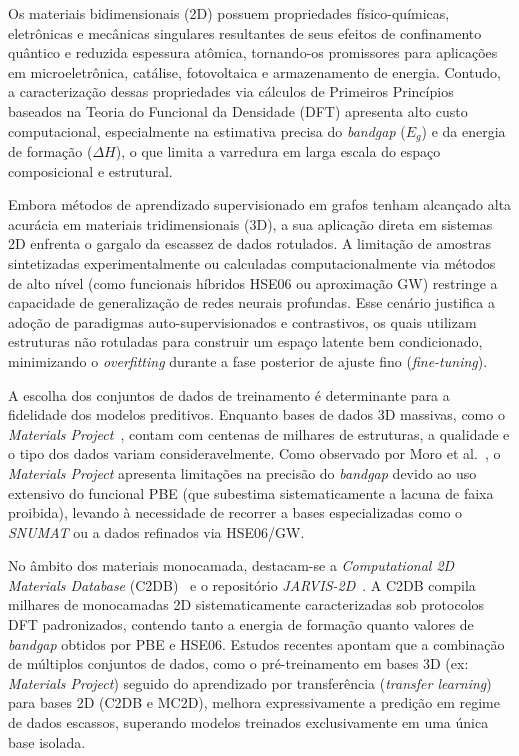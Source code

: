 Os materiais bidimensionais (2D) possuem propriedades físico-químicas, eletrônicas e mecânicas singulares resultantes de seus efeitos de confinamento quântico e reduzida espessura atômica, tornando-os promissores para aplicações em microeletrônica, catálise, fotovoltaica e armazenamento de energia. Contudo, a caracterização dessas propriedades via cálculos de Primeiros Princípios baseados na Teoria do Funcional da Densidade (DFT) apresenta alto custo computacional, especialmente na estimativa precisa do \textit{bandgap} ($E_g$) e da energia de formação ($\Delta H$), o que limita a varredura em larga escala do espaço composicional e estrutural.

Embora métodos de aprendizado supervisionado em grafos tenham alcançado alta acurácia em materiais tridimensionais (3D), a sua aplicação direta em sistemas 2D enfrenta o gargalo da escassez de dados rotulados. A limitação de amostras sintetizadas experimentalmente ou calculadas computacionalmente via métodos de alto nível (como funcionais híbridos HSE06 ou aproximação GW) restringe a capacidade de generalização de redes neurais profundas. Esse cenário justifica a adoção de paradigmas auto-supervisionados e contrastivos, os quais utilizam estruturas não rotuladas para construir um espaço latente bem condicionado, minimizando o \textit{overfitting} durante a fase posterior de ajuste fino (\textit{fine-tuning}).

A escolha dos conjuntos de dados de treinamento é determinante para a fidelidade dos modelos preditivos. Enquanto bases de dados 3D massivas, como o \textit{Materials Project}~\cite{jain2013commentary}, contam com centenas de milhares de estruturas, a qualidade e o tipo dos dados variam consideravelmente. Como observado por Moro et al.~\cite{moro2025multimodal}, o \textit{Materials Project} apresenta limitações na precisão do \textit{bandgap} devido ao uso extensivo do funcional PBE (que subestima sistematicamente a lacuna de faixa proibida), levando à necessidade de recorrer a bases especializadas como o \textit{SNUMAT} ou a dados refinados via HSE06/GW.

No âmbito dos materiais monocamada, destacam-se a \textit{Computational 2D Materials Database} (C2DB)~\cite{haastrup2018computational, gantenbein2021c2db} e o repositório \textit{JARVIS-2D}~\cite{choudhary2020joint}. A C2DB compila milhares de monocamadas 2D sistematicamente caracterizadas sob protocolos DFT padronizados, contendo tanto a energia de formação quanto valores de \textit{bandgap} obtidos por PBE e HSE06. Estudos recentes apontam que a combinação de múltiplos conjuntos de dados, como o pré-treinamento em bases 3D (ex: \textit{Materials Project}) seguido do aprendizado por transferência (\textit{transfer learning}) para bases 2D (C2DB e MC2D), melhora expressivamente a predição em regime de dados escassos, superando modelos treinados exclusivamente em uma única base isolada.

